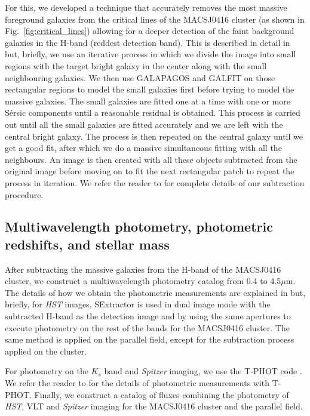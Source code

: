 \documentclass[twocolumn]{aastex63}
\begin{document}
For this, we developed a technique that accurately removes the most massive foreground galaxies from the critical lines of the MACSJ0416 cluster (as shown in Fig.~\ref{fig:critical_lines}) allowing for a deeper detection of the faint background galaxies in the H-band (reddest detection band). This is described in detail in \citet{Bhatawdekar2019} but, briefly, we use an iterative process in which we divide the image into small regions with the target bright galaxy in the center along with the small neighbouring galaxies. We then use GALAPAGOS \citep{Barden2012} and GALFIT \citep{Peng2002} on those rectangular regions to model the small galaxies first before trying to model the massive galaxies. The small galaxies are fitted one at a time with one or more S\'ersic \citep{Sersic1968} components until a reasonable residual is obtained. This process is carried out until all the small galaxies are fitted accurately and we are left with the central bright galaxy. The process is then repeated on the central galaxy until we get a good fit, after which we do a massive simultaneous fitting with all the neighbours. An image is then created with all these objects subtracted from the original image before moving on to fit the next rectangular patch to repeat the process in iteration. We refer the reader to \citet{Bhatawdekar2019} for complete details of our subtraction procedure.


\subsection{Multiwavelength photometry, photometric redshifts, and stellar mass} \label{sec:properties}
After subtracting the massive galaxies from the H-band of the MACSJ0416 cluster, we construct a multiwavelength photometry catalog from 0.4 to 4.5$\mu$m. The details of how we obtain the photometric measurements are explained in \citet{Bhatawdekar2019} but, briefly, for \textit{HST} images, SExtractor \citep{Bertin1996} is used in dual image mode with the subtracted H-band as the detection image and by using the same apertures to execute photometry on the rest of the bands for the MACSJ0416 cluster. The same method is applied on the parallel field, except for the subtraction process applied on the cluster. 

For photometry on the $K_{s}$ band and \textit{Spitzer} imaging, we use the T-PHOT code \citep{Merlin2015}. We refer the reader to \citet{Bhatawdekar2019} for the details of photometric measurements with T-PHOT. Finally, we construct a catalog of fluxes combining the photometry of \textit{HST}, VLT and \textit{Spitzer} imaging for the MACSJ0416 cluster and the parallel field.
\end{document}
